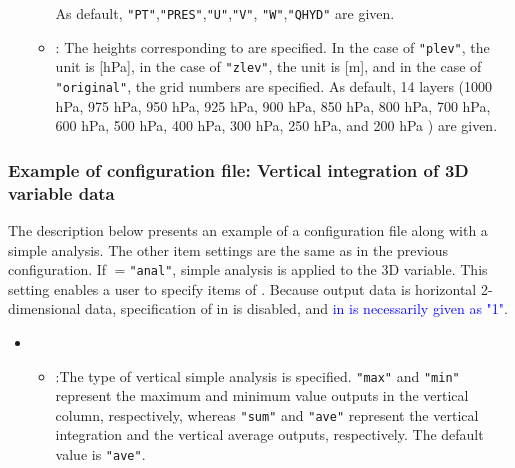 \begin{itemize}
\begin{itemize}
    As default, \verb|"PT"|,\verb|"PRES"|,\verb|"U"|,\verb|"V"|, \verb|"W"|,\verb|"QHYD"| are given.
  \item {}: The heights corresponding to  are specified.
    In the case of \verb|"plev"|, the unit is [hPa],
    in the case of \verb|"zlev"|, the unit is [m], and
    in the case of \verb|"original"|, the grid numbers are specified.
    As default, 14 layers (1000 hPa, 975 hPa, 950 hPa, 925 hPa, 900 hPa, 850 hPa, 800 hPa, 700 hPa, 600 hPa, 500 hPa, 400 hPa,
        300 hPa, 250 hPa, and 200 hPa ) are given.
 \end{itemize}
\end{itemize}

\subsubsection{Example of configuration file: Vertical integration of 3D variable data}
The description below presents an example of a configuration file along with a simple analysis.
The other item settings are the same as in the previous configuration.
If $=$\verb|"anal"|, simple analysis is applied to the 3D variable.
This setting enables a user to specify items of .
Because output data is horizontal 2-dimensional data,
specification of  in  is disabled,
and \textcolor{blue}{ in  is necessarily given as "1"}.
\begin{itemize}
 \item {}
 \begin{itemize}
  \item {}:The type of vertical simple analysis is specified. \verb|"max"| and \verb|"min"|
    represent the maximum and minimum value outputs in the vertical column, respectively, whereas \verb|"sum"| and \verb|"ave"| represent
    the vertical integration and the vertical average outputs, respectively. The default value is \verb|"ave"|.
 \end{itemize}
\end{itemize}

